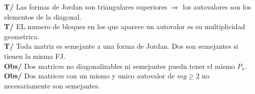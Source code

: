 \documentclass[10pt,a4paper]{article}
\begin{document}
\textbf{T/} Las formas de Jordan son triangulares superiores $\Rightarrow$ los autovalores son los elementos de la diagonal.\\
\textbf{T/} EL numero de bloques en los que aparece un autovalor es su multiplicidad geometrica.\\
\textbf{T/} Toda matriz es semejante a una forma de Jordan. Dos son semejantes si tienen la misma FJ.\\
\textbf{Obs/} Dos matrices no diagonalizables ni semejantes puedn tener el mismo $P_x$.\\
\textbf{Obs/} Dos matrices con un mismo y unico autovalor de $mg\geq2$ no necesariamente son semejantes.
\end{document}
